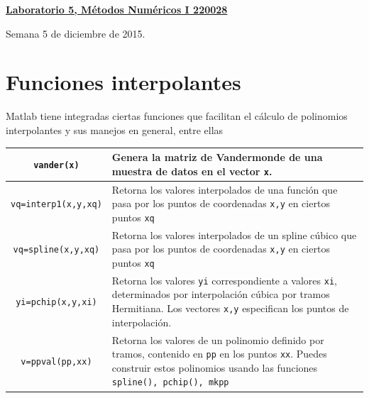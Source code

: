 \documentclass[11pt]{article}
\begin{document}
\hspace*{-1,5cm}

\vspace*{0.5cm} \centerline {\bf\underline{Laboratorio 5, M\'etodos Num\'ericos I 220028 }}
\centerline{\textrm{Semana 5 de diciembre de 2015.}}  \vspace{0.2cm}





\section{Funciones interpolantes}


Matlab tiene integradas ciertas funciones que facilitan el c\'alculo de polinomios interpolantes y sus manejos en general, entre ellas

\begin{longtable}{||c|p{}||}
\hline
\texttt{vander(x)} 			& Genera la matriz de Vandermonde de una muestra de datos en el vector \texttt{x}. \\
\hline
\texttt{vq=interp1(x,y,xq)}	& Retorna los valores interpolados de una funci\'on que pasa por los puntos de coordenadas \texttt{x,y} en ciertos puntos \texttt{xq} \\
\hline
\texttt{vq=spline(x,y,xq)}	& Retorna los valores interpolados de un spline c\'ubico que pasa por los puntos de coordenadas \texttt{x,y} en ciertos puntos \texttt{xq} \\
\hline 
\texttt{yi=pchip(x,y,xi)}	& Retorna los valores \texttt{yi} correspondiente a valores \texttt{xi}, determinados por interpolaci\'on c\'ubica por tramos Hermitiana. Los vectores \texttt{x,y} especifican los puntos de interpolaci\'on. \\
\hline
\texttt{v=ppval(pp,xx)}		& Retorna los valores de un polinomio definido por tramos, contenido en \texttt{pp} en los puntos \texttt{xx}. Puedes construir estos polinomios usando las funciones \texttt{spline(), pchip(), mkpp} 
\\
\hline
\end{longtable}
\end{document}
